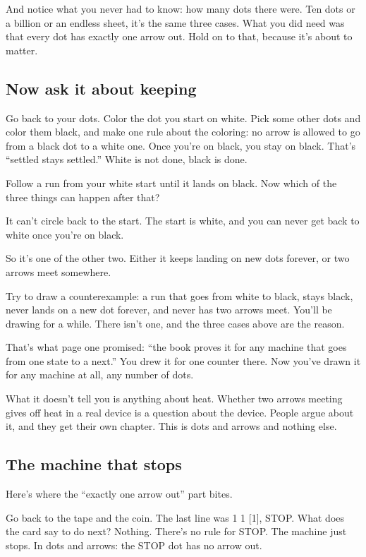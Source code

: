\documentclass[11pt,twoside]{article}
\theoremstyle{thielethm}
\theoremstyle{thieledef}
\theoremstyle{thieledef}
\theoremstyle{thieledef}
\theoremstyle{thielethm}
\theoremstyle{thieleobs}
\theoremstyle{thielethm}
\begin{document}
And notice what you never had to know: how many dots there were. Ten dots or a billion or an endless sheet, it's the same three cases. What you did need was that every dot has exactly one arrow out. Hold on to that, because it's about to matter.

\subsection{Now ask it about keeping}

Go back to your dots. Color the dot you start on white. Pick some other dots and color them black, and make one rule about the coloring: no arrow is allowed to go from a black dot to a white one. Once you're on black, you stay on black. That's ``settled stays settled.'' White is not done, black is done.

Follow a run from your white start until it lands on black. Now which of the three things can happen after that?

It can't circle back to the start. The start is white, and you can never get back to white once you're on black.

So it's one of the other two. Either it keeps landing on new dots forever, or two arrows meet somewhere.

Try to draw a counterexample: a run that goes from white to black, stays black, never lands on a new dot forever, and never has two arrows meet. You'll be drawing for a while. There isn't one, and the three cases above are the reason.

That's what page one promised: ``the book proves it for any machine that goes from one state to a next.'' You drew it for one counter there. Now you've drawn it for any machine at all, any number of dots.

What it doesn't tell you is anything about heat. Whether two arrows meeting gives off heat in a real device is a question about the device. People argue about it, and they get their own chapter. This is dots and arrows and nothing else.

\subsection{The machine that stops}

Here's where the ``exactly one arrow out'' part bites.

Go back to the tape and the coin. The last line was 1 1 [1], STOP. What does the card say to do next? Nothing. There's no rule for STOP. The machine just stops. In dots and arrows: the STOP dot has no arrow out.
\end{document}
